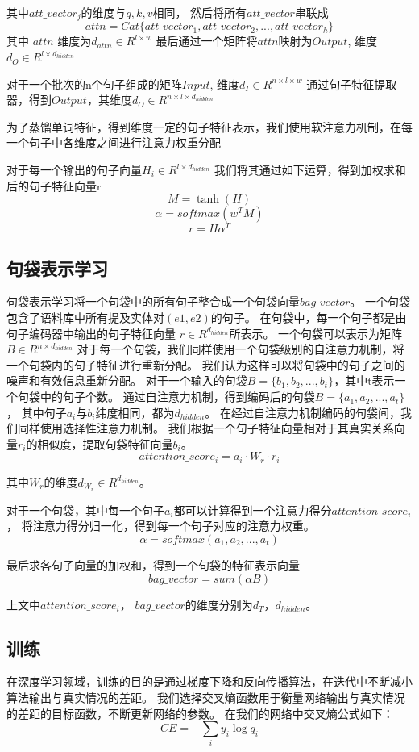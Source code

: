 \documentclass[UTF8]{csoarticle}
\begin{document}
其中$att\_vector_j$的维度与$q, k, v$相同，
然后将所有$att\_vector$串联成
\[attn = Cat\{att\_vector_1,att\_vector_2,...,att\_vector_h\}\]
其中 $attn$ 维度为$d_{attn} \in R^{l\times w}$
最后通过一个矩阵将$attn$映射为$Output$, 维度$d_{O} \in R^{l\times d_{hidden}}$

对于一个批次的n个句子组成的矩阵$Input$, 维度$d_{I} \in R^{n\times l\times w}$
通过句子特征提取器，得到$Output$，其维度$d_{O} \in R^{n\times l\times  d_{hidden}}$

为了蒸馏单词特征，得到维度一定的句子特征表示，我们使用软注意力机制，在每一个句子中各维度之间进行注意力权重分配

对于每一个输出的句子向量$ H_i \in R^{l \times d_{hidden}} $
我们将其通过如下运算，得到加权求和后的句子特征向量r
\[ M= \tanh(H) \]
\[ \alpha = softmax(w^T M) \]
\[ r = H \alpha^T \]

\subsection{句袋表示学习}
句袋表示学习将一个句袋中的所有句子整合成一个句袋向量$bag\_vector$。
一个句袋包含了语料库中所有提及实体对$(e1, e2)$的句子。
在句袋中，每一个句子都是由句子编码器中输出的句子特征向量 $r \in R^{d_{hidden}}$所表示。
一个句袋可以表示为矩阵$B \in R^{n \times d_{hidden}}$
对于每一个句袋，我们同样使用一个句袋级别的自注意力机制，将一个句袋内的句子特征进行重新分配。
我们认为这样可以将句袋中的句子之间的噪声和有效信息重新分配。
对于一个输入的句袋$B = \{b_1, b_2,...,b_t\}$，其中t表示一个句袋中的句子个数。
通过自注意力机制，得到编码后的句袋$B = \{a_1, a_2,...,a_t\}$，
其中句子$a_i$与$b_i$纬度相同，都为$d_{hidden}$。
在经过自注意力机制编码的句袋间，我们同样使用选择性注意力机制。
我们根据一个句子特征向量相对于其真实关系向量$r_i$的相似度，提取句袋特征向量$b_i$。
\[attention\_score_i =  a_i\cdot W_r \cdot r_i\]

其中$W_r$的维度$d_{W_r} \in R^{d_{hidden}}$。

对于一个句袋，其中每一个句子$a_i$都可以计算得到一个注意力得分$attention\_score_i$，
将注意力得分归一化，得到每一个句子对应的注意力权重。
\[\alpha = softmax({a_1,a_2,...,a_t})\]

最后求各句子向量的加权和，得到一个句袋的特征表示向量
\[bag\_vector = sum(\alpha  B)\]

上文中$attention\_score_i$， $bag\_vector$的维度分别为$d_T$，$d_{hidden}$。

\subsection{训练}
在深度学习领域，训练的目的是通过梯度下降和反向传播算法，在迭代中不断减小算法输出与真实情况的差距。
我们选择交叉熵函数用于衡量网络输出与真实情况的差距的目标函数，不断更新网络的参数。
在我们的网络中交叉熵公式如下：
\[ CE =-\sum _{i}y_i \log q_i\]
\end{document}
